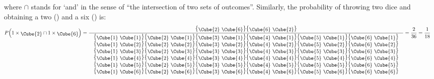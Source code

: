 \noindent where $\cap$ stands for `and' in the sense of ``the
intersection of two sets of outcomes''. Similarly, the probability of
throwing two dice and obtaining a two () and
a six () is:
\begin{equation}
  P\!\left(1\times{\mbox{\raisebox{-2pt}{\Cube{2}}}} \cap
  1\times\mbox{\raisebox{-2pt}{\Cube{6}}}\right) =
  \frac{
    \mbox{
      \big\{\raisebox{-2pt}{\Cube{2} \Cube{6}}\big\}\big\{\raisebox{-2pt}{\Cube{6} \Cube{2}}\big\}
    }
  }{
    \begin{array}{c}
      \mbox{
        \big\{\raisebox{-2pt}{\Cube{1} \Cube{1}}\big\}\big\{\raisebox{-2pt}{\Cube{2} \Cube{1}}\big\}\big\{\raisebox{-2pt}{\Cube{3} \Cube{1}}\big\}\big\{\raisebox{-2pt}{\Cube{4} \Cube{1}}\big\}\big\{\raisebox{-2pt}{\Cube{5} \Cube{1}}\big\}\big\{\raisebox{-2pt}{\Cube{6} \Cube{1}}\big\}
      }\\
      \mbox{
        \big\{\raisebox{-2pt}{\Cube{1} \Cube{2}}\big\}\big\{\raisebox{-2pt}{\Cube{2} \Cube{2}}\big\}\big\{\raisebox{-2pt}{\Cube{3} \Cube{2}}\big\}\big\{\raisebox{-2pt}{\Cube{4} \Cube{2}}\big\}\big\{\raisebox{-2pt}{\Cube{5} \Cube{2}}\big\}\big\{\raisebox{-2pt}{\Cube{6} \Cube{2}}\big\}
      }\\
      \mbox{
        \big\{\raisebox{-2pt}{\Cube{1} \Cube{3}}\big\}\big\{\raisebox{-2pt}{\Cube{2} \Cube{3}}\big\}\big\{\raisebox{-2pt}{\Cube{3} \Cube{3}}\big\}\big\{\raisebox{-2pt}{\Cube{4} \Cube{3}}\big\}\big\{\raisebox{-2pt}{\Cube{5} \Cube{3}}\big\}\big\{\raisebox{-2pt}{\Cube{6} \Cube{3}}\big\}
      }\\
      \mbox{
        \big\{\raisebox{-2pt}{\Cube{1} \Cube{4}}\big\}\big\{\raisebox{-2pt}{\Cube{2} \Cube{4}}\big\}\big\{\raisebox{-2pt}{\Cube{3} \Cube{4}}\big\}\big\{\raisebox{-2pt}{\Cube{4} \Cube{4}}\big\}\big\{\raisebox{-2pt}{\Cube{5} \Cube{4}}\big\}\big\{\raisebox{-2pt}{\Cube{6} \Cube{4}}\big\}
      }\\
      \mbox{
        \big\{\raisebox{-2pt}{\Cube{1} \Cube{5}}\big\}\big\{\raisebox{-2pt}{\Cube{2} \Cube{5}}\big\}\big\{\raisebox{-2pt}{\Cube{3} \Cube{5}}\big\}\big\{\raisebox{-2pt}{\Cube{4} \Cube{5}}\big\}\big\{\raisebox{-2pt}{\Cube{5} \Cube{5}}\big\}\big\{\raisebox{-2pt}{\Cube{6} \Cube{5}}\big\}
      }\\
      \mbox{
        \big\{\raisebox{-2pt}{\Cube{1} \Cube{6}}\big\}\big\{\raisebox{-2pt}{\Cube{2} \Cube{6}}\big\}\big\{\raisebox{-2pt}{\Cube{3} \Cube{6}}\big\}\big\{\raisebox{-2pt}{\Cube{4} \Cube{6}}\big\}\big\{\raisebox{-2pt}{\Cube{5} \Cube{6}}\big\}\big\{\raisebox{-2pt}{\Cube{6} \Cube{6}}\big\}
      }
    \end{array}
  } = \frac{2}{36} = \frac{1}{18}
  \label{eq:1116}
\end{equation}

